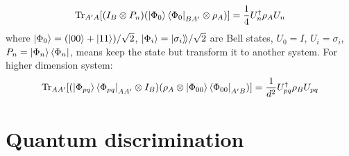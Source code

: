 \documentclass[11pt,a4paper]{article}%
\numberwithin{equation}{section}
\newcommand\kk{\rangle\!\rangle}
\newcommand{\Tr}{\operatorname{Tr}}
\begin{document}
\begin{enumerate}
    \begin{equation}
        \Tr_{A'A}[(I_B\otimes P_n)(\ket{\Phi_0}\bra{\Phi_0}_{BA'}\otimes\rho_A)] = \frac 14 U_n^\dagger\rho_A U_n
    \end{equation}
    where $\ket{\Phi_0} = (\ket{00}+\ket{11})/\sqrt 2$, $\ket{\Phi_i} = |\sigma_i\kk/\sqrt 2$ are Bell states, $U_0 = I$, $U_i = \sigma_i$, $P_n = \ket{\Phi_n}\bra{\Phi_n}$, means keep the state but transform it to another system. For higher dimension system:
    \begin{equation}
        \Tr_{AA'}[(\ket{\Phi_{pq}}\bra{\Phi_{pq}}_{AA'}\otimes I_B)(\rho_A\otimes\ket{\Phi_{00}}\bra{\Phi_{00}}_{A'B})] = \frac 1{d^2} U_{pq}^\dagger \rho_B U_{pq}
    \end{equation}
\end{enumerate}

\section{Quantum discrimination}
\end{document}
